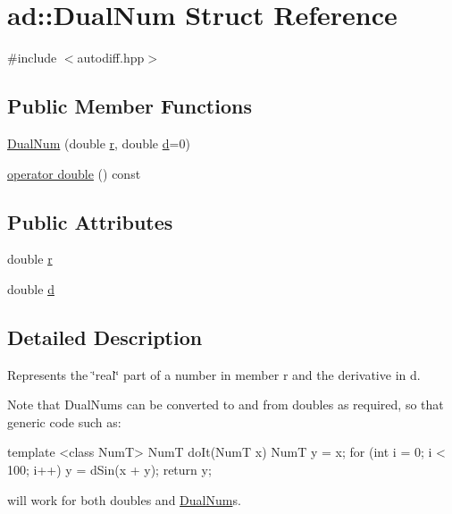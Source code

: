 \hypertarget{structad_1_1_dual_num}{\section{ad\-:\-:Dual\-Num Struct Reference}
\label{structad_1_1_dual_num}
}


{\ttfamily \#include $<$autodiff.\-hpp$>$}

\subsection*{Public Member Functions}
\begin{DoxyCompactItemize}
\item 
\hyperlink{structad_1_1_dual_num_a59cc7ae0820734ea70b97a5e44a31994}{Dual\-Num} (double \hyperlink{structad_1_1_dual_num_a86ca68cdb3ebb5c5c9d0ac207d70070d}{r}, double \hyperlink{structad_1_1_dual_num_a7a586615c50054527be7cee7f1ac1148}{d}=0)
\item 
\hyperlink{structad_1_1_dual_num_aff54e197c1eeaf2421908cb55f0cd824}{operator double} () const 
\end{DoxyCompactItemize}
\subsection*{Public Attributes}
\begin{DoxyCompactItemize}
\item 
double \hyperlink{structad_1_1_dual_num_a86ca68cdb3ebb5c5c9d0ac207d70070d}{r}
\item 
double \hyperlink{structad_1_1_dual_num_a7a586615c50054527be7cee7f1ac1148}{d}
\end{DoxyCompactItemize}


\subsection{Detailed Description}
Represents the \char`\"{}real\char`\"{} part of a number in member {\ttfamily r} and the derivative in {\ttfamily d}.

Note that {\ttfamily Dual\-Nums} can be converted to and from {\ttfamily double}s as required, so that generic code such as\-: \begin{DoxyVerb} template <class NumT>
 NumT doIt(NumT x) {
     NumT y = x;
     for (int i = 0; i < 100; i++) {
         y = dSin(x + y);
     }
     return y;
 }\end{DoxyVerb}
 will work for both {\ttfamily double}s and {\ttfamily \hyperlink{structad_1_1_dual_num}{Dual\-Num}}s. 

